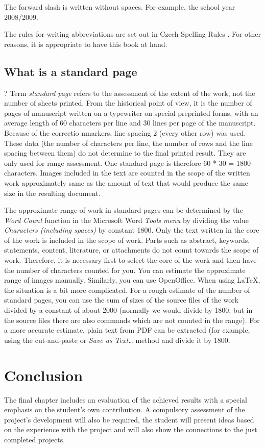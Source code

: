 The forward slash is written without spaces. For example, the school year 2008/2009.

The rules for writing abbreviations are set out in Czech Spelling Rules \cite{Pravidla}. For other reasons, it is appropriate to have this book at hand.



\section{What is a standard page}?
Term {\it standard page} refers to the assessment of the extent of the work, not the number of sheets printed. From the historical point of view, it is the number of pages of manuscript written on a typewriter on special preprinted forms, with an average length of 60 characters per line and 30 lines per page of the manuscript. Because of the correctio nmarkers, line spacing 2 (every other row) was used. These data (the number of characters per line, the number of rows and the line spacing between them) do not determine to the final printed result. They are only used for range assessment. One standard page is therefore 60 * 30 = 1800 characters. Images included in the text are counted in the scope of the written work approximately same as the amount of text that would produce the same size in the resulting document.

The approximate range of work in standard pages can be determined by the {\it Word Count} function in the Microsoft Word {\it Tools menu} by dividing the value {\it Characters (including spaces)} by constant 1800. Only the text written in the core of the work is included in the scope of work. Parts such as abstract, keywords, statements, content, literature, or attachments do not count towards the scope of work. Therefore, it is necessary first to select the core of the work and then have the number of characters counted for you. You can estimate the approximate range of images manually. Similarly, you can use OpenOffice. When using LaTeX, the situation is a bit more complicated. For a rough estimate of the number of standard pages, you can use the sum of sizes of the source files of the work divided by a constant of about 2000 (normally we would divide by 1800, but in the source files there are also commands which are not counted in the range). For a more accurate estimate, plain text from PDF can be extracted (for example, using the cut-and-paste or {\it Save as Text\ldots} method and divide it by 1800. 


\chapter{Conclusion}
The final chapter includes an evaluation of the achieved results with a special emphasis on the student's own contribution. A compulsory assessment of the project's development will also be required, the student will present ideas based on the experience with the project and will also show the connections to the just completed projects.

